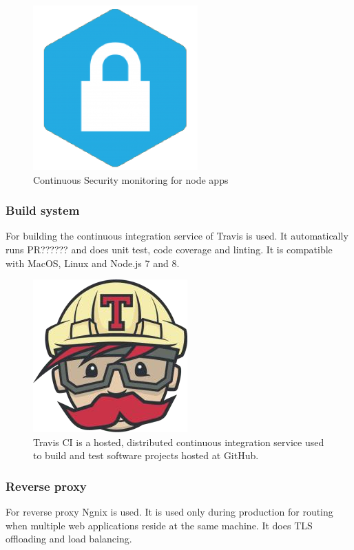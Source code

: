 \begin{figure}[h]
  \begin{center}
    \includegraphics[scale=0.2]{./images/security.png}
    \caption{Continuous Security monitoring for node apps}
    \label{fig:}
  \end{center}
\end{figure}

\subsubsection{Build system}
For building the continuous integration service of Travis is used. It automatically runs PR?????? and does unit test, code coverage and linting. It is compatible with MacOS, Linux and Node.js 7 and 8.

\begin{figure}[h]
  \begin{center}
    \includegraphics[scale=0.3]{./images/travis.png}
    \caption{Travis CI is a hosted, distributed continuous integration service used to build and test software projects hosted at GitHub.}
    \label{fig:}
  \end{center}
\end{figure}

\subsubsection{Reverse proxy}
For reverse proxy Ngnix is used. It is used only during production for routing when multiple web applications reside at the same machine. It does TLS offloading and load balancing.

